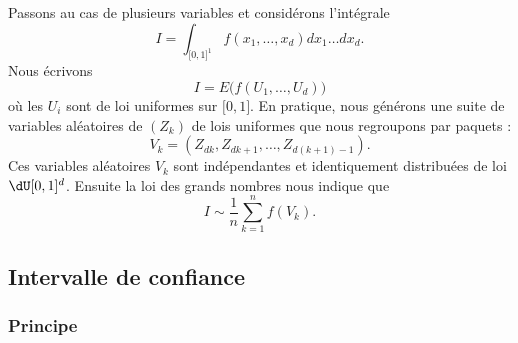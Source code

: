 Passons au cas de plusieurs variables et considérons l'intégrale
\begin{equation}
	I=\int_{\mathopen[ 0 , 1 \mathclose]^1}f(x_1,\ldots,x_d)dx_1\ldots dx_d.
\end{equation}
Nous écrivons
\begin{equation}
	I=E\big( f(U_1,\ldots,U_d) \big)
\end{equation}
où les \( U_i\) sont de loi uniformes sur \( \mathopen[ 0 , 1 \mathclose]\). En pratique, nous générons une suite de variables aléatoires de \( (Z_k)\) de lois uniformes que nous regroupons par paquets :
\begin{equation}
	V_k=(Z_{dk},Z_{dk+1},\ldots,Z_{d(k+1)-1}).
\end{equation}
Ces variables aléatoires \( V_k\) sont indépendantes et identiquement distribuées de loi \( \dU\mathopen[ 0 , 1 \mathclose]^{d}\). Ensuite la loi des grands nombres nous indique que
\begin{equation}
	I\sim\frac{1}{ n }\sum_{k=1}^nf(V_k).
\end{equation}

\subsection{Intervalle de confiance}

\subsubsection{Principe}

